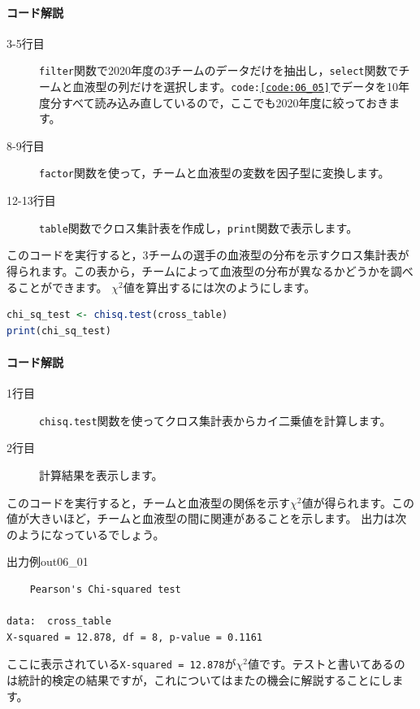 \documentclass{ltjsbook}
\begin{document}
\paragraph{コード解説}
\begin{description}
    \item[3-5行目] \verb|filter|関数で2020年度の3チームのデータだけを抽出し，\verb|select|関数でチームと血液型の列だけを選択します。\texttt{code:\ref{code:06_05}}でデータを10年度分すべて読み込み直しているので，ここでも2020年度に絞っておきます。
    \item[8-9行目] \verb|factor|関数を使って，チームと血液型の変数を因子型に変換します。
    \item[12-13行目] \verb|table|関数でクロス集計表を作成し，\verb|print|関数で表示します。
\end{description}

このコードを実行すると，3チームの選手の血液型の分布を示すクロス集計表が得られます。この表から，チームによって血液型の分布が異なるかどうかを調べることができます。
$\chi^2$値を算出するには次のようにします。

\begin{lstlisting}[language=R,label={code:06_08},caption={カイ二乗値の計算}]
chi_sq_test <- chisq.test(cross_table)
print(chi_sq_test)
\end{lstlisting}

\paragraph{コード解説}
\begin{description}
    \item[1行目] \verb|chisq.test|関数を使ってクロス集計表からカイ二乗値を計算します。
    \item[2行目] 計算結果を表示します。
\end{description}

このコードを実行すると，チームと血液型の関係を示す$\chi^2$値が得られます。この値が大きいほど，チームと血液型の間に関連があることを示します。
出力は次のようになっているでしょう。

\begin{Rscreen}{出力例}{out06_01}
\begin{verbatim}
	Pearson's Chi-squared test

data:  cross_table
X-squared = 12.878, df = 8, p-value = 0.1161
\end{verbatim}
\end{Rscreen}

ここに表示されている\verb|X-squared = 12.878|が$\chi^2$値です。テストと書いてあるのは統計的検定の結果ですが，これについてはまたの機会に解説することにします。
\end{document}
